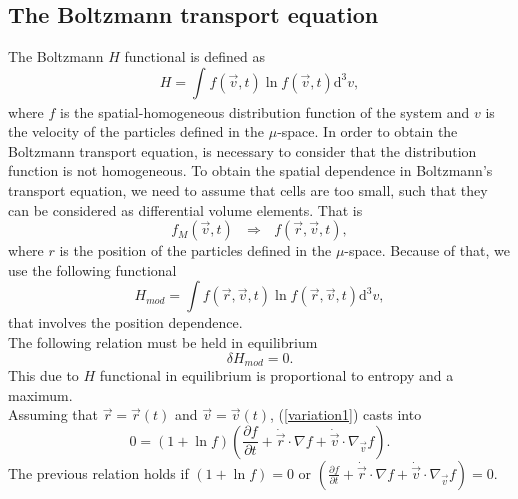 \documentclass{article}
\begin{document}
\subsection{The Boltzmann transport equation}
The Boltzmann $H$ functional is defined as
\begin{equation}
    H=\int_{}^{}f(\vec{v},t)\ln f(\vec{v},t)\mathrm{d}^{3}v,
\end{equation}
where $f$ is the spatial-homogeneous distribution function of the system and $v$ is the velocity of the particles defined in the $\mu$-space. In order to obtain the Boltzmann transport equation, is necessary to consider that the distribution function is not homogeneous. To obtain the spatial dependence in Boltzmann's transport equation, we need to assume that cells are too small, such that they can be considered as differential volume elements. That is
\begin{equation}
    f_M(\vec{v},t)    \ \ \ \Rightarrow \ \ \ f(\vec{r},\vec{v},t),
\end{equation}
where $r$ is the position of the particles defined in the $\mu$-space. Because of that, we use the following functional
\begin{equation}
    H_{mod}=\int f(\vec{r},\vec{v},t) \ln f(\vec{r},\vec{v},t) \mathrm{d}^{3}v,
\end{equation}
that involves the position dependence.
\\
The following relation must be held in equilibrium 
\begin{equation}
    \delta H_{mod}=0.\label{variation1}
\end{equation}
This due to $H$ functional in equilibrium is proportional to entropy and a maximum.\\ 
Assuming that $\vec{r}=\vec{r}(t)$ and $\vec{v}=\vec{v}(t)$, (\ref{variation1}) casts into
\begin{equation}
    0=\left( 1+\ln f \right)\left( \frac{\partial f}{\partial t}+\dot{\vec{r}}\cdot \nabla f+\dot{\vec{v}}\cdot \nabla_{\vec{v}} f \right).
\end{equation}
The previous relation holds if $(1+\ln f)=0$ or $(\frac{\partial f}{\partial t}+\dot{\vec{r}}\cdot \nabla f+\dot{\vec{v}}\cdot \nabla_{\vec{v}} f)=0$.\\
\end{document}
